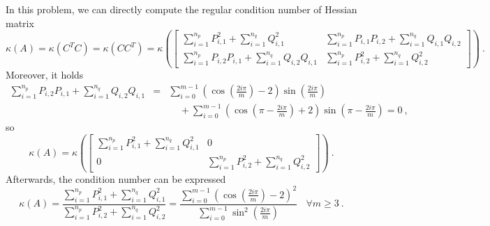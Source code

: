 \documentclass{article}
\theoremstyle{definition}
\begin{document}
In this problem, we can directly compute the regular condition number of Hessian matrix 
\begin{displaymath}
 \kappa (A) = \kappa (C^T C) = \kappa (CC^T) = \kappa
 \left( \left[
  \begin{array}{cc}
   \sum\limits_{i = 1}^{n_p} P_{i,1}^2 + \sum\limits_{i = 1}^{n_q} Q_{i,1}^2 & \sum\limits_{i = 1}^{n_p} P_{i,1} P_{i,2} + \sum\limits_{i = 1}^{n_q} Q_{i,1} Q_{i,2} \\
   \sum\limits_{i = 1}^{n_p} P_{i,2} P_{i,1} + \sum\limits_{i = 1}^{n_q} Q_{i,2} Q_{i,1} & \sum\limits_{i = 1}^{n_p} P_{i,2}^2 + \sum\limits_{i = 1}^{n_q} Q_{i,2}^2
  \end{array}
 \right] \right) ~\mathrm{.}
\end{displaymath}
Moreover, it holds
\begin{displaymath}
 \begin{array}{rcl}
 \sum\limits_{i = 1}^{n_p} P_{i,2} P_{i,1} + \sum\limits_{i = 1}^{n_q} Q_{i,2} Q_{i,1} & = &
	\sum\limits_{i = 0}^{m-1} 
		\left( \cos \left( \frac{2i\pi}{m} \right) - 2 \right)
		\sin \left( \frac{2i\pi}{m} \right) \\
  & & ~~~~~ + 
 \sum\limits_{i = 0}^{m-1} 
  \left( \cos \left( \pi - \frac{2i\pi}{m} \right) + 2 \right)
  \sin \left( \pi - \frac{2i\pi}{m} \right)
 = 0~\mathrm{,}
 \end{array} 
\end{displaymath}
so
\begin{displaymath}
 \kappa (A) = \kappa
 \left( \left[
  \begin{array}{cc}
   \sum\limits_{i = 1}^{n_p} P_{i,1}^2 + \sum\limits_{i = 1}^{n_q} Q_{i,1}^2 & 0 \\
   0 & \sum\limits_{i = 1}^{n_p} P_{i,2}^2 + \sum\limits_{i = 1}^{n_q} Q_{i,2}^2
  \end{array}
 \right] \right) ~\mathrm{.}
\end{displaymath}
Afterwards, the condition number can be expressed
\begin{displaymath}
\kappa (A) = \frac{\sum\limits_{i = 1}^{n_p} P_{i,1}^2 + \sum\limits_{i = 1}^{n_q} Q_{i,1}^2}{\sum\limits_{i = 1}^{n_p} P_{i,2}^2 + \sum\limits_{i = 1}^{n_q} Q_{i,2}^2} =
\frac{\sum\limits_{i=0}^{m-1} \left( \cos \left( \frac{2i\pi}{m} \right) - 2 \right)^2}{\sum\limits_{i=0}^{m-1} \sin^2 \left( \frac{2i\pi}{m} \right)} ~~~~ \forall m \geq 3 ~\mathrm{.}
\end{displaymath}
\end{document}
